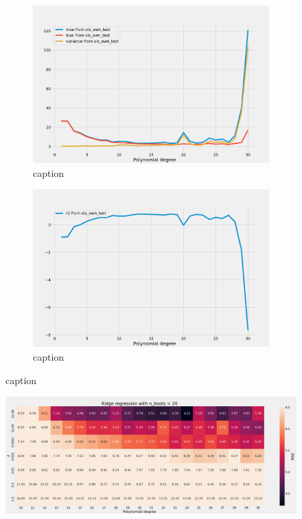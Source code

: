 \begin{figure}
\centering
\begin{subfigure}{0.49\textwidth}
    \includegraphics[width=\textwidth]{Figures/g_ols_bias_variance_boots_n_20.png}
    \caption{caption}
    \label{fig:first}
\end{subfigure}
\hfill
\begin{subfigure}{0.49\textwidth}
    \includegraphics[width=\textwidth]{Figures/g_ols_r2_boots_n_20.png}
    \caption{caption }
    \label{fig:second}
\end{subfigure}
\end{figure}


\begin{figure}[H]
    \centering
    \includegraphics[width=\textwidth]{Figures/g_ridge_heatmap_boots_n_20.png}
\end{figure}

